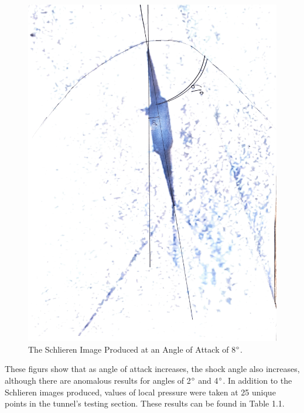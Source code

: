 \documentclass[stu, a4paper, 12pt, floatsintext]{apa7}
\numberwithin{figure}{section}
\numberwithin{table}{section}
\numberwithin{equation}{section}
\begin{document}
\begin{figure}[H]
    \caption{The Schlieren Image Produced at an Angle of Attack of 8$\degree$.}
    \label{fig:aero_eight}
    \centering
    \includegraphics[width=1.0\textwidth]{pictures/eight.png}
\end{figure}
These figurs show that as angle of attack increases, the shock angle also increases, although there are anomalous results for angles of 2$\degree$ and 4$\degree$. 
In addition to the Schlieren images produced, values of local pressure were taken at 25 unique points in the tunnel's testing section. These results can be found in Table 1.1.
\end{document}
